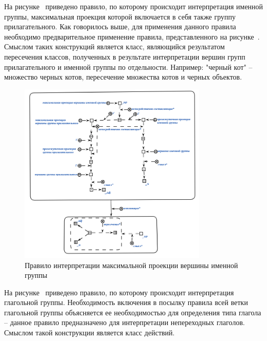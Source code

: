На рисунке~\textit{} приведено правило, по которому происходит интерпретация именной группы, максимальная проекция которой включается в себя также группу прилагательного.
Как говорилось выше, для применения данного правила необходимо предварительное применение правила, представленного на рисунке~\textit{}.
Смыслом таких конструкций является класс, являющийся результатом пересечения классов, полученных в результате интерпретации вершин групп прилагательного и именной группы по отдельности. Например: "черный кот" -- множество черных котов, пересечение множества котов и черных объектов. %

\begin{figure}[h]
    \centering
    \includegraphics[width=0.8\textwidth]{images/part2/chapter_lang/d_sem_2.png}
    \caption{Правило интерпретации максимальной проекции вершины именной группы}
    \label{fig:d_sem_2}
\end{figure}

На рисунке~\textit{} приведено правило, по которому происходит интерпретация глагольной группы. Необходимость включения в посылку правила всей ветки глагольной группы объясняется ее необходимостью для определения типа глагола -- данное правило предназначено для интерпретации непереходных глаголов. Смыслом такой конструкции является класс действий.

